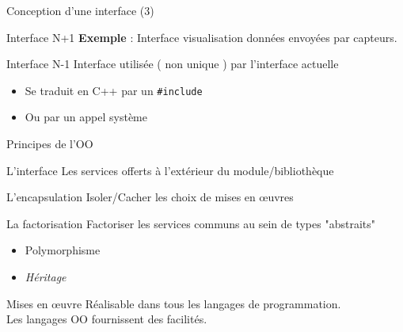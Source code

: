 \documentclass[compress,10pt,aspectratio=169]{beamer}
\begin{document}
\begin{frame}[fragile]{Conception d'une interface (3)}
\begin{multicols}{2}
\begin{block}{\small Interface N+1}
        \textbf{Exemple} : Interface visualisation données envoyées par capteurs.
        \end{block}
        \columnbreak
        \begin{block}{\small Interface N-1}
        Interface utilisée ( non unique ) par l'interface actuelle
        \begin{itemize}
        \item Se traduit en C++ par un \texttt{#include}
        \item Ou par un appel système
        \end{itemize}
        \end{block}
      \end{multicols}
        \end{frame}

\begin{frame}{Principes de l'OO}
  \scriptsize
  \begin{multicols}{2}
  \begin{minipage}{0.49\textwidth}
  \begin{block}{\small L'interface}
  Les services offerts à l'extérieur du module/bibliothèque
  \end{block}
  \begin{block}{\small L'encapsulation}
  Isoler/Cacher les choix de mises en {\oe}uvres
  \end{block}
\end{minipage}
  \columnbreak
  \begin{minipage}{0.49\textwidth}
    \begin{block}{\small La factorisation}
  Factoriser les services communs au sein de types "abstraits"
  \begin{itemize}
  \item Polymorphisme
  \item \textsl{Héritage}
  \end{itemize}
  \end{block}
  
  \begin{alertblock}{\small Mises en {\oe}uvre}
  Réalisable dans tous les langages de programmation.\\
  Les langages OO fournissent des facilités.
  \end{alertblock}
\end{minipage}
\end{multicols}
  \end{frame}
\end{document}
